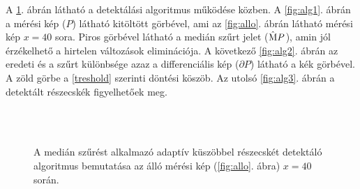 	A \ref{fig:alg}. ábrán látható a detektálási algoritmus működése közben.
	A \ref{fig:alg1}. ábrán a mérési kép ($P$) látható kitöltött görbével, ami az \ref{fig:allo}. ábrán
	látható mérési kép $x=40$ sora.
	Piros görbével látható a medián szűrt jelet ($\mathrm{\hat{M}}P$), amin jól érzékelhető a hirtelen
	változások eliminációja.
	A következő \ref{fig:alg2}. ábrán az eredeti és a szűrt különbsége azaz a differenciális kép
	($\partial P$) látható a kék görbével. A zöld görbe a \eqref{treshold} szerinti
	döntési köszöb.
	Az utolsó \ref{fig:alg3}. ábrán a detektált részecskék figyelhetőek meg.
	
	\begin{figure}[!h]
		\centering
		\\
		\\
		\caption[Adaptív küszöb bemutatása]{A medián szűrést alkalmazó adaptív küszöbbel részecskét
		detektáló algoritmus bemutatása az álló mérési kép (\ref{fig:allo}. ábra) $x=40$ során.}
		\label{fig:alg}
	\end{figure}
	
